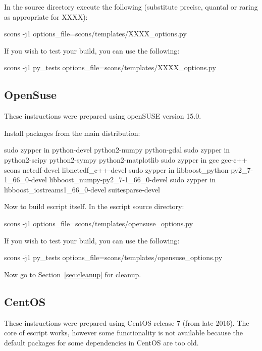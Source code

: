 \noindent In the source directory execute the following (substitute precise, quantal or raring as appropriate for XXXX):
\begin{shellCode}
scons -j1 options_file=scons/templates/XXXX_options.py
\end{shellCode}

\noindent If you wish to test your build, you can use the following:
\begin{shellCode}
scons -j1 py_tests options_file=scons/templates/XXXX_options.py 
\end{shellCode}



\subsection{OpenSuse}\label{sec:susesrc}
These instructions were prepared using openSUSE version 15.0.

\noindent Install packages from the main distribution:
\begin{shellCode}
sudo zypper in python-devel python2-numpy python-gdal
sudo zypper in python2-scipy python2-sympy python2-matplotlib 
sudo zypper in gcc gcc-c++ scons netcdf-devel libnetcdf_c++-devel
sudo zypper in libboost_python-py2_7-1_66_0-devel libboost_numpy-py2_7-1_66_0-devel
sudo zypper in libboost_iostreams1_66_0-devel suitesparse-devel
\end{shellCode}

Now to build escript itself.
In the escript source directory:
\begin{shellCode}
scons -j1 options_file=scons/templates/opensuse_options.py
\end{shellCode}

\noindent If you wish to test your build, you can use the following:
\begin{shellCode}
scons -j1 py_tests options_file=scons/templates/opensuse_options.py 
\end{shellCode}

\noindent Now go to Section~\ref{sec:cleanup} for cleanup.

\subsection{CentOS}\label{sec:centossrc}
These instructions were prepared using CentOS release $7$ (from late 2016).
The core of escript works, however some functionality is not available because the default packages for some dependencies in CentOS are too old.

